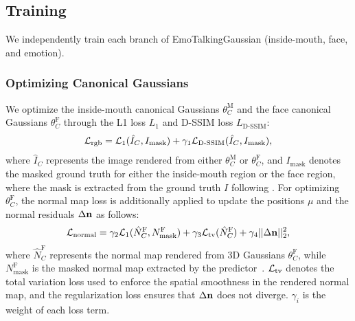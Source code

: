 \subsection{Training}
We independently train each branch of EmoTalkingGaussian (inside-mouth, face, and emotion).
\subsubsection{Optimizing Canonical Gaussians}
We optimize the inside-mouth canonical Gaussians $\theta^\text{M}_C$ and the face canonical Gaussians $\theta^\text{F}_C$ through the L1 loss $L_1$ and D-SSIM loss $L_\text{D-SSIM}$:
\begin{eqnarray}
    \mathcal{L}_\text{rgb} = \mathcal{L}_1 (\hat{I}_C, I_\text{mask}) + \gamma_1 \mathcal{L}_\text{D-SSIM} (\hat{I}_C, I_\text{mask}),
    \label{eq:rgb_loss}
\end{eqnarray}
where $\hat{I}_C$ represents the image rendered from either $\theta^\text{M}_C$ or $\theta^\text{F}_C$, and $I_\text{mask}$ denotes the masked ground truth for either the inside-mouth region or the face region, where the mask is extracted from the ground truth $I$ following \cite{li2024talkinggaussian}. For optimizing $\theta^\text{F}_C$, the normal map loss is additionally applied to update the positions $\mu$ and the normal residuals $\Delta \mathbf{n}$ as follows: 
\begin{eqnarray}
    \mathcal{L}_\text{normal} = \gamma_2 \mathcal{L}_1 (\hat{N}^\text{F}_C, N^\text{F}_\text{mask}) + \gamma_3 \mathcal{L}_\text{tv}(\hat{N}^\text{F}_C) 
    + \gamma_4 || \Delta \mathbf{n} ||^2_2,
    \label{eq:normal_loss}
\end{eqnarray}
where $\hat{N}^\text{F}_C$ represents the normal map rendered from 3D Gaussians $\theta^\text{F}_C$, while $N^\text{F}_\text{mask}$ is the masked normal map extracted by the predictor~\cite{Abrevaya_2020_CVPR}. $\mathcal{L}_\text{tv}$ denotes the total variation loss used to enforce the spatial smoothness in the rendered normal map, and the regularization loss ensures that $\Delta \mathbf{n}$ does not diverge. $\gamma_i$ is the weight of each loss term.


